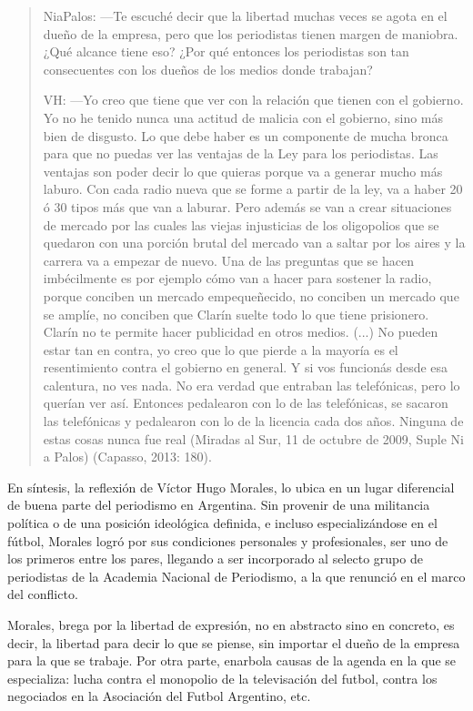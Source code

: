 \begin{quote}
NiaPalos: ---Te escuché decir que la libertad muchas veces se agota en el dueño de la empresa, pero que los periodistas tienen margen de maniobra. ¿Qué alcance tiene eso? ¿Por qué entonces los periodistas son tan consecuentes con los dueños de los medios donde trabajan?

VH: ---Yo creo que tiene que ver con la relación que tienen con el gobierno. Yo no he tenido nunca una actitud de malicia con el gobierno, sino más bien de disgusto. Lo que debe haber es un componente de mucha bronca para que no puedas ver las ventajas de la Ley para los periodistas. Las ventajas son poder decir lo que quieras porque va a generar mucho más laburo. Con cada radio nueva que se forme a partir de la ley, va a haber 20 ó 30 tipos más que van a laburar. Pero además se van a crear situaciones de mercado por las cuales las viejas injusticias de los oligopolios que se quedaron con una porción brutal del mercado van a saltar por los aires y la carrera va a empezar de nuevo. Una de las preguntas que se hacen imbécilmente es por ejemplo cómo van a hacer para sostener la radio, porque conciben un mercado empequeñecido, no conciben un mercado que se amplíe, no conciben que Clarín suelte todo lo que tiene prisionero. Clarín no te permite hacer publicidad en otros medios. (...) No pueden estar tan en contra, yo creo que lo que pierde a la mayoría es el resentimiento contra el gobierno en general. Y si vos funcionás desde esa calentura, no ves nada. No era verdad que entraban las telefónicas, pero lo querían ver así. Entonces pedalearon con lo de las telefónicas, se sacaron las telefónicas y pedalearon con lo de la licencia cada dos años. Ninguna de estas cosas nunca fue real (Miradas al Sur, 11 de octubre de 2009, Suple Ni a Palos) (Capasso, 2013: 180).
\end{quote}

En síntesis, la reflexión de Víctor Hugo Morales, lo ubica en un lugar diferencial de buena parte del periodismo en Argentina. Sin provenir de una militancia política o de una posición ideológica definida, e incluso especializándose en el fútbol, Morales logró por sus condiciones personales y profesionales, ser uno de los primeros entre los pares, llegando a ser incorporado al selecto grupo de periodistas de la Academia Nacional de Periodismo, a la que renunció en el marco del conflicto.

Morales, brega por la libertad de expresión, no en abstracto sino en concreto, es decir, la libertad para decir lo que se piense, sin importar el dueño de la empresa para la que se trabaje. Por otra parte, enarbola causas de la agenda en la que se especializa: lucha contra el monopolio de la televisación del futbol, contra los negociados en la Asociación del Futbol Argentino, etc.

